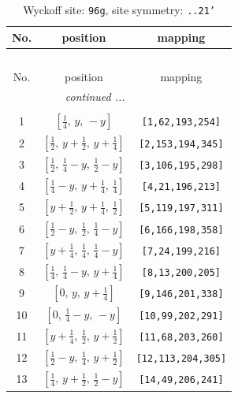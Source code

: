 \documentclass[fleqn,8pt]{jsarticle}
\begin{document}
\begin{longtable}{ccc}
\caption{Wyckoff site: {\tt 96g}, site symmetry: {\tt ..21'}}
 \\
 \hline \hline
No. & position & mapping \\ \hline \endfirsthead

\multicolumn{2}{l}{\tablename\ \thetable{}} \\
 \hline \hline
No. & position & mapping \\ \hline \endhead

 \hline \hline
\multicolumn{2}{r}{\footnotesize\it continued ...} \\ \endfoot

 \hline \hline
\multicolumn{2}{r}{} \\ \endlastfoot

1 & $\left[ \frac{1}{4},\, y,\, - y \right]$ & {\tt [1,62,193,254]} \\ \hline
2 & $\left[ \frac{1}{2},\, y + \frac{1}{2},\, y + \frac{1}{4} \right]$ & {\tt [2,153,194,345]} \\ \hline
3 & $\left[ \frac{1}{2},\, \frac{1}{4} - y,\, \frac{1}{2} - y \right]$ & {\tt [3,106,195,298]} \\ \hline
4 & $\left[ \frac{1}{4} - y,\, y + \frac{1}{4},\, \frac{1}{4} \right]$ & {\tt [4,21,196,213]} \\ \hline
5 & $\left[ y + \frac{1}{2},\, y + \frac{1}{4},\, \frac{1}{2} \right]$ & {\tt [5,119,197,311]} \\ \hline
6 & $\left[ \frac{1}{2} - y,\, \frac{1}{2},\, \frac{1}{4} - y \right]$ & {\tt [6,166,198,358]} \\ \hline
7 & $\left[ y + \frac{1}{4},\, \frac{1}{4},\, \frac{1}{4} - y \right]$ & {\tt [7,24,199,216]} \\ \hline
8 & $\left[ \frac{1}{4},\, \frac{1}{4} - y,\, y + \frac{1}{4} \right]$ & {\tt [8,13,200,205]} \\ \hline
9 & $\left[ 0,\, y,\, y + \frac{1}{4} \right]$ & {\tt [9,146,201,338]} \\ \hline
10 & $\left[ 0,\, \frac{1}{4} - y,\, - y \right]$ & {\tt [10,99,202,291]} \\ \hline
11 & $\left[ y + \frac{1}{4},\, \frac{1}{2},\, y + \frac{1}{2} \right]$ & {\tt [11,68,203,260]} \\ \hline
12 & $\left[ \frac{1}{2} - y,\, \frac{1}{4},\, y + \frac{1}{2} \right]$ & {\tt [12,113,204,305]} \\ \hline
13 & $\left[ \frac{1}{4},\, y + \frac{1}{2},\, \frac{1}{2} - y \right]$ & {\tt [14,49,206,241]} \\ \hline

\end{longtable}
\end{document}
